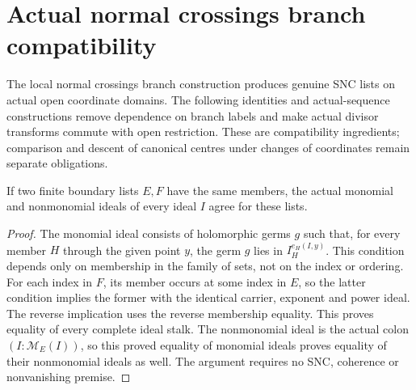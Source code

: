 \section{Actual normal crossings branch compatibility}

The local normal crossings branch construction produces genuine SNC
lists on actual open coordinate domains.  The following identities and
actual-sequence constructions remove dependence on branch labels and
make actual divisor transforms commute with open restriction.  These
are compatibility ingredients; comparison and descent of canonical
centres under changes of coordinates remain separate obligations.

\begin{lemma}
\label{hir:nc-intrinsic-ideal-member-independence}
\leanok
If two finite boundary lists $E,F$ have the same members, the actual
monomial and nonmonomial ideals of every ideal $I$ agree for these lists.
\end{lemma}
\begin{proof}
The monomial ideal consists of holomorphic germs $g$ such that, for
every member $H$ through the given point $y$, the germ $g$ lies in
$I_H^{e_H(I,y)}$.  This condition depends only on membership in the
family of sets, not on the index or ordering.  For each index in $F$,
its member occurs at some index in $E$, so the latter condition implies
the former with the identical carrier, exponent and power ideal.
The reverse implication uses the reverse membership equality.
This proves equality of every complete ideal stalk.  The nonmonomial
ideal is the actual colon $(I:\mathcal M_E(I))$, so this proved equality
of monomial ideals proves equality of their nonmonomial ideals as well.
The argument requires no SNC, coherence or nonvanishing premise.
\end{proof}

